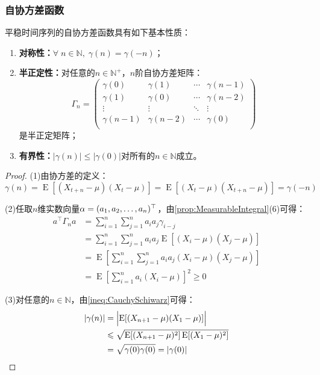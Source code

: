 \subsubsection{自协方差函数}
\begin{property}
	平稳时间序列的自协方差函数具有如下基本性质：
	\begin{enumerate}
		\item \textbf{对称性：}$\forall\;n\in\mathbb{N},\;\gamma(n)=\gamma(-n)$；
		\item \textbf{半正定性：}对任意的$n\in\mathbb{N}^+$，$n$阶自协方差矩阵：
		\begin{equation*}
			\Gamma_n=
			\begin{pmatrix}
				\gamma(0) & \gamma(1) & \cdots & \gamma(n-1) \\
				\gamma(1) & \gamma(0) & \cdots & \gamma(n-2) \\
				\vdots & \vdots & \ddots & \vdots \\
				\gamma(n-1) & \gamma(n-2) & \cdots & \gamma(0) \\
			\end{pmatrix}
		\end{equation*}
		是半正定矩阵；
		\item \textbf{有界性：}$|\gamma(n)|\leqslant|\gamma(0)|$对所有的$n\in\mathbb{N}$成立。
	\end{enumerate}
\end{property}
\begin{proof}
	(1)由协方差的定义：
	\begin{equation*}
		\gamma(n)=\operatorname{E}[(X_{t+n}-\mu)(X_t-\mu)]=\operatorname{E}[(X_t-\mu)(X_{t+n}-\mu)]=\gamma(-n)
	\end{equation*}\par
	(2)任取$n$维实数向量$\alpha=(a_1, a_2, \dots, a_{n})^{\top}$，由\cref{prop:MeasurableIntegral}(6)可得：
	\begin{align*}
		a^{\top}\Gamma_na
		&=\sum_{i=1}^{n}\sum_{j=1}^{n}a_ia_j\gamma_{i-j} \\
		&=\sum_{i=1}^{n}\sum_{j=1}^{n}a_ia_j\operatorname{E}[(X_i-\mu)(X_j-\mu)]\\
		&=\operatorname{E}\left[\sum_{i=1}^{n}\sum_{j=1}^{n}a_ia_j(X_i-\mu)(X_j-\mu)\right] \\
		&=\operatorname{E}\left[\sum_{i=1}^{n}a_i(X_i-\mu)\right]^2\geqslant0
	\end{align*}\par
	(3)对任意的$n\in \mathbb{N}$，由\cref{ineq:CauchySchiwarz}可得：
	\begin{align*}
		|\gamma(n)|
		&=\Bigl|\operatorname{E}[(X_{n+1}-\mu)(X_1-\mu)]\Bigr| \\
		&\leqslant\sqrt{\operatorname{E}[(X_{n+1}-\mu)^2]\operatorname{E}[(X_1-\mu)^2]} \\
		&=\sqrt{\gamma(0)\gamma(0)}=|\gamma(0)|\qedhere
	\end{align*}
\end{proof}
